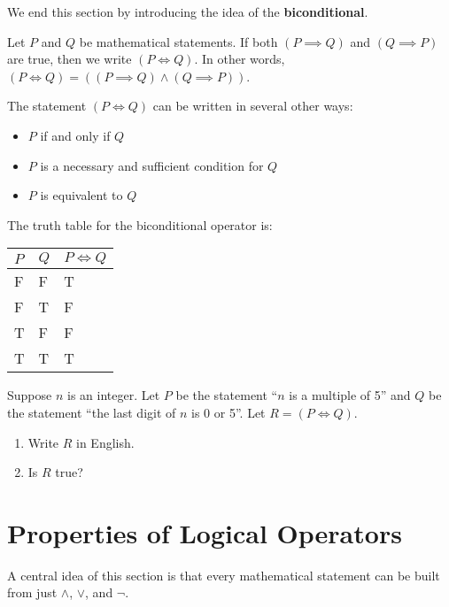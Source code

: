 We end this section by introducing the idea of the \textbf{biconditional}.
\begin{definition}
    Let $P$ and $Q$ be mathematical statements. If both $(P \implies Q)$ and $(Q \implies P)$ are true, then we write $(P \iff Q)$. In other words, $(P \iff Q) = ((P \implies Q) \land (Q \implies P))$.
\end{definition}
\begin{remark}
    The statement $(P \iff Q)$ can be written in several other ways:
    \begin{itemize}
        \item $P$ if and only if $Q$
        \item $P$ is a necessary and sufficient condition for $Q$
        \item $P$ is equivalent to $Q$
    \end{itemize}
\end{remark}

The truth table for the biconditional operator is:
\begin{table}[h]
    \centering
    \begin{tabular}{|l|l||l|}
        \hline
        $P$ & $Q$ & $P\iff Q$ \\ \hline
        F   & F   & T         \\ \hline
        F   & T   & F         \\ \hline
        T   & F   & F         \\ \hline
        T   & T   & T         \\ \hline
    \end{tabular}
\end{table}

\begin{exercise}
    Suppose $n$ is an integer. Let $P$ be the statement ``$n$ is a multiple of 5'' and $Q$ be the statement ``the last digit of $n$ is 0 or 5''. Let $R = (P \iff Q)$.
    \begin{enumerate}[label=(\roman*)]
        \item Write $R$ in English.
        \item Is $R$ true?
    \end{enumerate}
\end{exercise}

\section{Properties of Logical Operators}
A central idea of this section is that every mathematical statement can be built from just $\land$, $\lor$, and $\lnot$.

